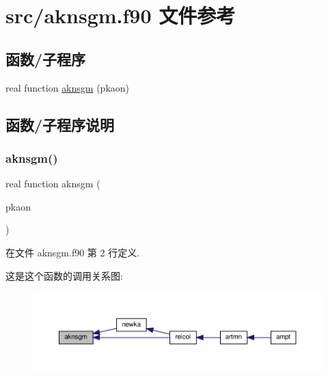 \hypertarget{aknsgm_8f90}{}\section{src/aknsgm.f90 文件参考}
\label{aknsgm_8f90}
\subsection*{函数/子程序}
\begin{DoxyCompactItemize}
\item 
real function \mbox{\hyperlink{aknsgm_8f90_a8f38c902e7bfb30ba33847bd76eb4fb0}{aknsgm}} (pkaon)
\end{DoxyCompactItemize}


\subsection{函数/子程序说明}
\mbox{\label{aknsgm_8f90_a8f38c902e7bfb30ba33847bd76eb4fb0}} 
\subsubsection{\texorpdfstring{aknsgm()}{aknsgm()}}
{\footnotesize\ttfamily real function aknsgm (\begin{DoxyParamCaption}\item[{}]{pkaon }\end{DoxyParamCaption})}



在文件 aknsgm.\+f90 第 2 行定义.

这是这个函数的调用关系图\+:
\nopagebreak
\begin{figure}[H]
\begin{center}
\leavevmode
\includegraphics[width=350pt]{aknsgm_8f90_a8f38c902e7bfb30ba33847bd76eb4fb0_icgraph}
\end{center}
\end{figure}
